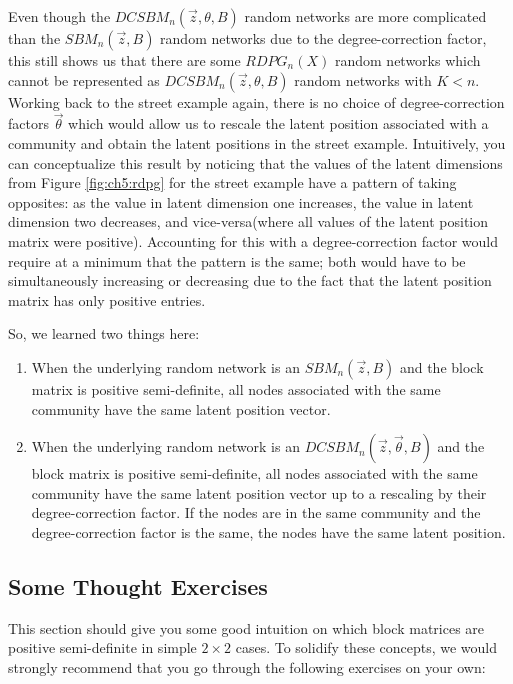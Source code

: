  Even though the $DCSBM_n(\vec z, \theta, B)$ random networks are more complicated than the $SBM_n(\vec z, B)$ random networks due to the degree-correction factor, this still shows us that there are some $RDPG_n(X)$ random networks which cannot be represented as $DCSBM_n(\vec z, \theta, B)$ random networks with $K < n$. Working back to the street example again, there is no choice of degree-correction factors $\vec \theta$ which would allow us to rescale the latent position associated with a community and obtain the latent positions in the street example. Intuitively, you can conceptualize this result by noticing that the values of the latent dimensions from Figure \ref{fig:ch5:rdpg} for the street example have a pattern of taking opposites: as the value in latent dimension one increases, the value in latent dimension two decreases, and vice-versa(where all values of the latent position matrix were positive). Accounting for this with a degree-correction factor would require at a minimum that the pattern is the same; both would have to be simultaneously increasing or decreasing due to the fact that the latent position matrix has only positive entries.
 
So, we learned two things here:
\begin{enumerate}
    \item When the underlying random network is an $SBM_n(\vec z, B)$ and the block matrix is positive semi-definite, all nodes associated with the same community have the same latent position vector.
    \item When the underlying random network is an $DCSBM_n(\vec z, \vec \theta, B)$ and the block matrix is positive semi-definite, all nodes associated with the same community have the same latent position vector up to a rescaling by their degree-correction factor. If the nodes are in the same community and the degree-correction factor is the same, the nodes have the same latent position.
\end{enumerate}

\subsection{Some Thought Exercises}

This section should give you some good intuition on which block matrices are positive semi-definite in simple $2 \times 2$ cases. To solidify these concepts, we would strongly recommend that you go through the following exercises on your own:

